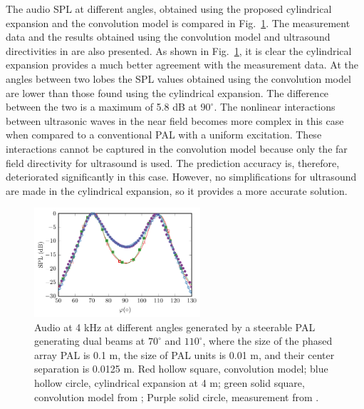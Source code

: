 The audio SPL at different angles, obtained using the proposed cylindrical expansion and the convolution model is compared in Fig.~\ref{fig:cwe_results_dual_beam}. 
The measurement data and the results obtained using the convolution model and ultrasound directivities in \cite{Shi2015ConvolutionModelComputing} are also presented. 
As shown in Fig.~\ref{fig:cwe_results_dual_beam}, it is clear the cylindrical expansion provides a much better agreement with the measurement data. 
At the angles between two lobes the SPL values obtained using the convolution model are lower than those found using the cylindrical expansion. 
The difference between the two is a maximum of 5.8 dB at $90^\circ$. 
The nonlinear interactions between ultrasonic waves in the near field becomes more complex in this case when compared to a conventional PAL with a uniform excitation. 
These interactions cannot be captured in the convolution model because only the far field directivity for ultrasound is used. The prediction accuracy is, therefore, deteriorated significantly in this case. 
However, no simplifications for ultrasound are made in the cylindrical expansion, so it provides a more accurate solution. 

\begin{figure}[!htb]
    \centering
    \includegraphics[width = 0.55\textwidth]{fig/Shi2015JasaFig8_Directivity_Compare_v4_211014H.pdf}
    \caption{Audio  at 4 kHz at different angles generated by a steerable PAL generating dual beams at $70^\circ$ and $110^\circ$, where the size of the phased array PAL is 0.1 m, the size of PAL units is 0.01 m, and their center separation is 0.0125 m.
    Red hollow square, convolution model; blue hollow circle, cylindrical expansion at 4 m; green solid square, convolution model from \cite{Shi2015ConvolutionModelComputing}; Purple solid circle, measurement from \cite{Shi2015ConvolutionModelComputing}.}
    \label{fig:cwe_results_dual_beam}
\end{figure}


